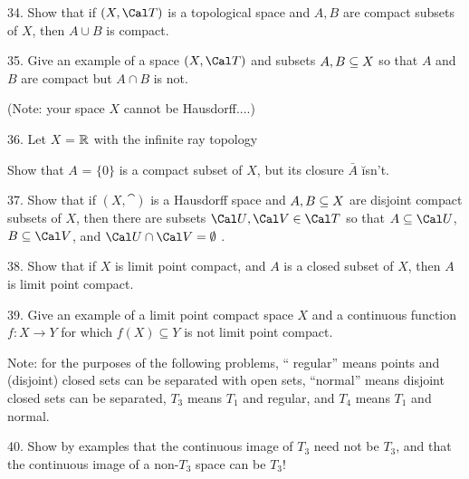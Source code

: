 \ssk

\item{34.} Show that if $(X,{\Cal T})$ is a topological space and $A,B$ are compact subsets
of $X$, then $A\cup B$ is compact.

\ssk

\item{35.} Give an example of a space $(X,{\Cal T})$ and subsets $A,B\subseteq X$ so that
$A$ and $B$ are compact but $A\cap B$ is not.

\ssk

\item{} (Note: your space $X$ cannot be Hausdorff....)

\ssk

\item{36.} Let $X$ = $\Bbb R$ with the infinite ray topology 

\ssk


\ssk

Show that $A$ = $\{0\}$ is a compact subset of $X$, but its closure $\bar{A}$ \u{isn't}.

\ssk

\item{37.} Show that if $(X,\cat)$ is a Hausdorff space and $A,B\subseteq X$ are disjoint compact
subsets of $X$, then there are subsets $\cau,\cav\in \cat$ so that $A\sset \cau$, $B\sset \cav$,
and $\cau\cap\cav =\emptyset$ .

\ssk

\item{38.} Show that if $X$ is limit point compact, and $A$ is a closed subset of $X$, then
$A$ is limit point compact.

\ssk

\item{39.} Give an example of a limit point compact space $X$ and a continuous function
$f: X\rightarrow Y$ for which $f(X)\subseteq Y$ is not limit point compact.

\ssk

\ni Note: for the purposes of the following problems, `` regular'' means 
points and (disjoint) closed sets can be separated with open sets, ``normal'' means 
disjoint closed sets can be separated, $T_3$ means $T_1$ and regular, and
$T_4$ means $T_1$ and normal.

\ssk

\item{40.} Show by examples that the continuous image of $T_3$ need not
be $T_3$, and that the continuous image of a non-$T_3$ space can be $T_3$!

